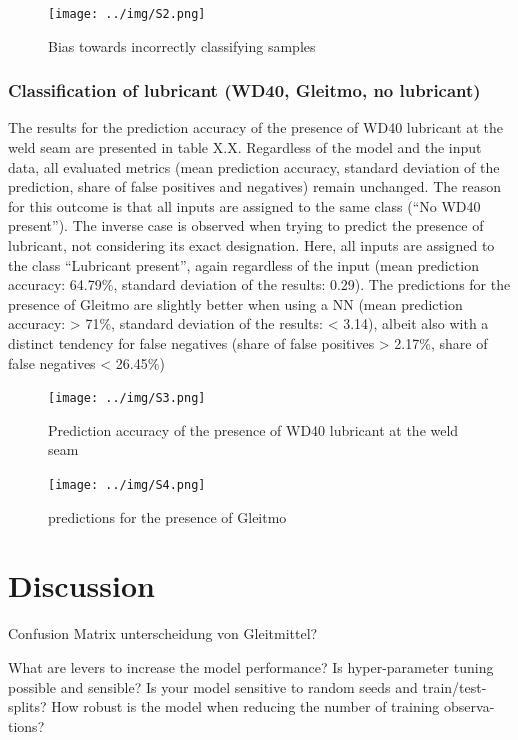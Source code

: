 \documentclass[12pt]{report}
\begin{document}
\begin{figure}[H]
	\centering
	\texttt{[image: ../img/S2.png]}
	\caption{Bias towards incorrectly classifying samples}
	\label{fig:S2}
\end{figure}

\subsection{Classification of lubricant (WD40, Gleitmo, no lubricant)} 
The results for the prediction accuracy of the presence of WD40 lubricant at the weld seam are presented in table X.X. Regardless of the model and the input data, all evaluated metrics (mean prediction accuracy, standard deviation of the prediction, share of false positives and negatives) remain unchanged. The reason for this outcome is that all inputs are assigned to the same class (“No WD40 present”).
The inverse case is observed when trying to predict the presence of lubricant, not considering its exact designation. Here, all inputs are assigned to the class “Lubricant present”, again regardless of the input (mean prediction accuracy: 64.79\%, standard deviation of the results: 0.29).
The predictions for the presence of Gleitmo are slightly better when using a NN (mean prediction accuracy: > 71\%, standard deviation of the results:  < 3.14), albeit also with a distinct tendency for false negatives (share of false positives > 2.17\%, share of false negatives < 26.45\%)

\begin{figure}[H]
	\centering
	\texttt{[image: ../img/S3.png]}
	\caption{Prediction accuracy of the presence of WD40 lubricant at the weld seam }
	\label{fig:S3}
\end{figure} 

\begin{figure}[H]
	\centering
	\texttt{[image: ../img/S4.png]}
	\caption{predictions for the presence of Gleitmo }
	\label{fig:S4}
\end{figure}


\chapter{Discussion}
Confusion Matrix
unterscheidung von Gleitmittel?

What are levers to increase the model performance? Is hyper-parameter tuning possible and
sensible? Is your model sensitive to random seeds and train/test-splits?
How robust is the model when reducing the number of training observa-
tions?
\end{document}
